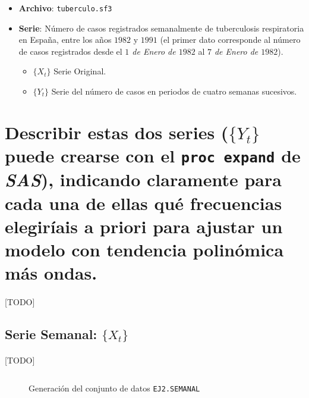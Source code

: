\documentclass[a4paper, spanish]{article}
\begin{document}
  \maketitle

  \begin{itemize}
    \item \textbf{Archivo}: \texttt{tuberculo.sf3}
    \item \textbf{Serie}: Número de casos registrados semanalmente de tuberculosis respiratoria en España, entre los años $1982$ y $1991$ (el primer dato corresponde al número de casos registrados desde el \emph{$1$ de Enero de $1982$} al \emph{$7$ de Enero de $1982$}).
    \begin{itemize}
      \item $\{X_t\}$ Serie Original.
      \item $\{Y_t\}$ Serie del número de casos en periodos de cuatro semanas sucesivos.
    \end{itemize}
  \end{itemize}

  \section{Describir estas dos series ($\{Y_t\}$ puede crearse con el \texttt{proc expand} de \emph{SAS}), indicando claramente para cada una de ellas qué frecuencias elegiríais a priori para ajustar un modelo con tendencia polinómica más ondas.}
  \label{sec:a}

    \paragraph{}
    [TODO]

    \subsection{Serie Semanal: $\{X_t\}$}

      \paragraph{}
      [TODO]

      \begin{figure}[htb!]
        \centering
        \inputminted{SAS}{./res/code/a-01-data.sas}
        \caption{Generación del conjunto de datos \texttt{EJ2.SEMANAL}}
        \label{code:a_data}
      \end{figure}
\end{document}
